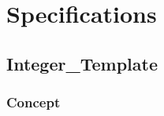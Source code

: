 

\section{Specifications\label{apx:specs}}

	\subsection{Integer\_Template}	%

		\subsubsection{Concept}	%

